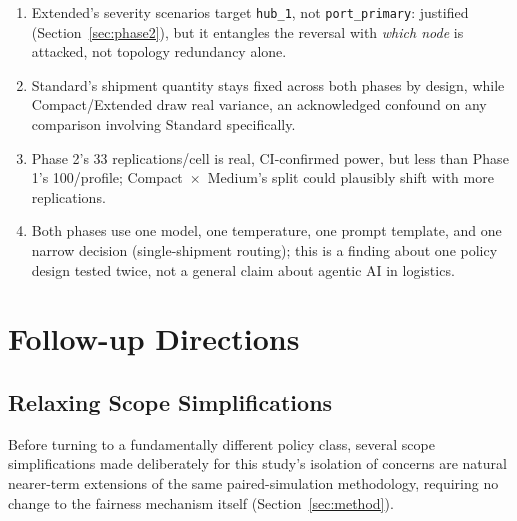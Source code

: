 \documentclass[10pt,twocolumn]{article}
\begin{document}
\begin{enumerate}[leftmargin=1.4em,itemsep=2pt,label=(\arabic*)]
\item Extended's severity scenarios target \texttt{hub\_1}, not \texttt{port\_primary}: justified (Section~\ref{sec:phase2}), but it entangles the reversal with \emph{which node} is attacked, not topology redundancy alone.
\item Standard's shipment quantity stays fixed across both phases by design, while Compact/Extended draw real variance, an acknowledged confound on any comparison involving Standard specifically.
\item Phase 2's 33 replications/cell is real, CI-confirmed power, but less than Phase 1's 100/profile; Compact~$\times$~Medium's split could plausibly shift with more replications.
\item Both phases use one model, one temperature, one prompt template, and one narrow decision (single-shipment routing); this is a finding about one policy design tested twice, not a general claim about agentic AI in logistics.
\end{enumerate}

\section{Follow-up Directions}
\label{sec:followup}

\subsection{Relaxing Scope Simplifications}
\label{sec:scope-followup}
Before turning to a fundamentally different policy class, several scope simplifications made deliberately for this study's isolation of concerns are natural nearer-term extensions of the same paired-simulation methodology, requiring no change to the fairness mechanism itself (Section~\ref{sec:method}).
\end{document}
